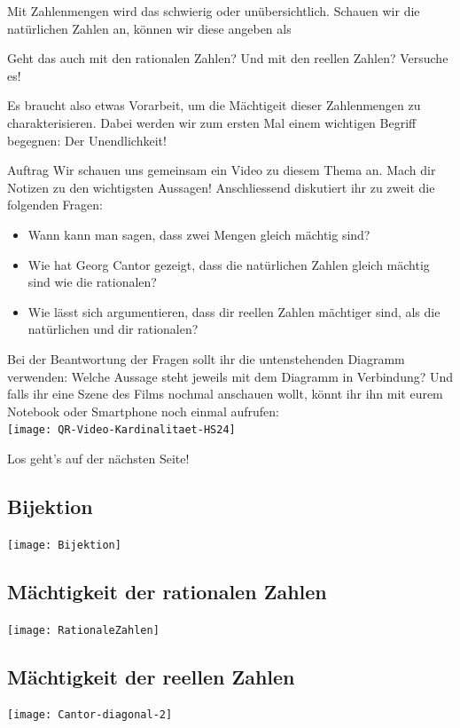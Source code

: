 Mit Zahlenmengen wird das schwierig oder unübersichtlich. Schauen wir die natürlichen Zahlen an, können wir diese angeben als

\vspace{1.5cm}

Geht das auch mit den rationalen Zahlen? Und mit den reellen Zahlen? Versuche es!

\vspace{1.5cm}

Es braucht also etwas Vorarbeit, um die Mächtigeit dieser Zahlenmengen zu charakterisieren. Dabei werden wir zum ersten Mal einem wichtigen Begriff begegnen: Der Unendlichkeit! 

\begin{task}{Auftrag}
Wir schauen uns gemeinsam ein Video zu diesem Thema an. Mach dir Notizen zu den wichtigsten Aussagen! Anschliessend diskutiert ihr zu zweit die folgenden Fragen:
	\begin{itemize}
		\item
			Wann kann man sagen, dass zwei Mengen gleich mächtig sind?
		\item
			Wie hat Georg Cantor gezeigt, dass die natürlichen Zahlen gleich mächtig sind wie die rationalen?
		\item
			Wie lässt sich argumentieren, dass dir reellen Zahlen mächtiger sind, als die natürlichen und dir rationalen?
	\end{itemize}
	Bei der Beantwortung der Fragen sollt ihr die untenstehenden Diagramm verwenden: Welche Aussage steht jeweils mit dem Diagramm in Verbindung? Und falls ihr eine Szene des Films nochmal anschauen wollt, könnt ihr ihn mit eurem Notebook oder Smartphone noch einmal aufrufen:\\
	\texttt{[image: QR-Video-Kardinalitaet-HS24]}
\end{task}

Los geht's auf der nächsten Seite!

\newpage


\subsection{Bijektion}
\texttt{[image: Bijektion]}

\subsection{Mächtigkeit der rationalen Zahlen}
\texttt{[image: RationaleZahlen]}

\subsection{Mächtigkeit der reellen Zahlen}
\texttt{[image: Cantor-diagonal-2]}

\newpage
